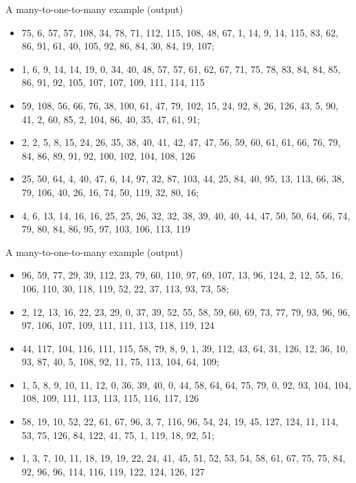 \documentclass[10pt]{beamer}
\begin{document}
 \begin{frame}{A many-to-one-to-many example (output)}
 \begin{itemize}
   \item 75, 6, 57, 57, 108, 34, 78, 71, 112, 115, 108, 48, 67, 1, 14, 9, 14, 115, 83, 62, 86, 91, 61, 40, 105, 92, 86, 84, 30, 84, 19, 107;
   \item 1, 6, 9, 14, 14, 19, 0, 34, 40, 48, 57, 57, 61, 62, 67, 71, 75, 78, 83, 84, 84, 85, 86, 91, 92, 105, 107, 107, 109, 111, 114, 115
 \end{itemize}
 \begin{itemize}
   \item 59, 108, 56, 66, 76, 38, 100, 61, 47, 79, 102, 15, 24, 92, 8, 26, 126, 43, 5, 90, 41, 2, 60, 85, 2, 104, 86, 40, 35, 47, 61, 91;
   \item 2, 2, 5, 8, 15, 24, 26, 35, 38, 40, 41, 42, 47, 47, 56, 59, 60, 61, 61, 66, 76, 79, 84, 86, 89, 91, 92, 100, 102, 104, 108, 126
 \end{itemize}
 \begin{itemize}
   \item 25, 50, 64, 4, 40, 47, 6, 14, 97, 32, 87, 103, 44, 25, 84, 40, 95, 13, 113, 66, 38, 79, 106, 40, 26, 16, 74, 50, 119, 32, 80, 16;
   \item 4, 6, 13, 14, 16, 16, 25, 25, 26, 32, 32, 38, 39, 40, 40, 44, 47, 50, 50, 64, 66, 74, 79, 80, 84, 86, 95, 97, 103, 106, 113, 119
 \end{itemize}
 \end{frame}

 \begin{frame}{A many-to-one-to-many example (output)}
 \begin{itemize}
   \item 96, 59, 77, 29, 39, 112, 23, 79, 60, 110, 97, 69, 107, 13, 96, 124, 2, 12, 55, 16, 106, 110, 30, 118, 119, 52, 22, 37, 113, 93, 73, 58;
   \item 2, 12, 13, 16, 22, 23, 29, 0, 37, 39, 52, 55, 58, 59, 60, 69, 73, 77, 79, 93, 96, 96, 97, 106, 107, 109, 111, 111, 113, 118, 119, 124
 \end{itemize}
 \begin{itemize}
   \item 44, 117, 104, 116, 111, 115, 58, 79, 8, 9, 1, 39, 112, 43, 64, 31, 126, 12, 36, 10, 93, 87, 40, 5, 108, 92, 11, 75, 113, 104, 64, 109;
   \item 1, 5, 8, 9, 10, 11, 12, 0, 36, 39, 40, 0, 44, 58, 64, 64, 75, 79, 0, 92, 93, 104, 104, 108, 109, 111, 113, 113, 115, 116, 117, 126
 \end{itemize}
 \begin{itemize}
   \item 58, 19, 10, 52, 22, 61, 67, 96, 3, 7, 116, 96, 54, 24, 19, 45, 127, 124, 11, 114, 53, 75, 126, 84, 122, 41, 75, 1, 119, 18, 92, 51;
   \item 1, 3, 7, 10, 11, 18, 19, 19, 22, 24, 41, 45, 51, 52, 53, 54, 58, 61, 67, 75, 75, 84, 92, 96, 96, 114, 116, 119, 122, 124, 126, 127
 \end{itemize}
 \end{frame}
\end{document}
